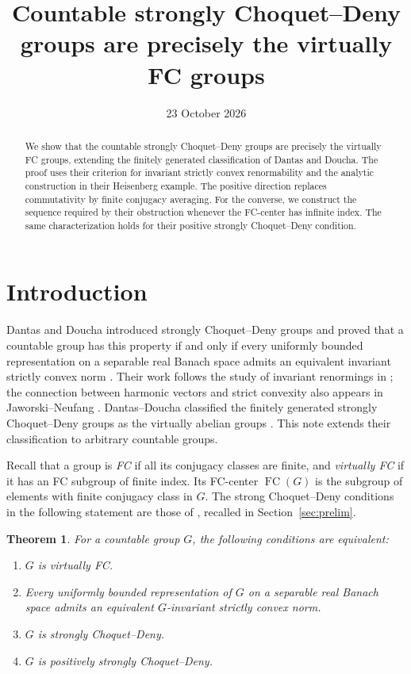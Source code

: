 \documentclass[11pt,letterpaper]{amsart}
\title[The classification of countable strongly Choquet--Deny groups]{Countable strongly Choquet--Deny groups
are precisely the virtually FC groups}
\date{23 October 2026}
\newtheorem{theorem}{Theorem}[section]
\theoremstyle{definition}
\theoremstyle{remark}
\DeclareMathOperator{\FC}{FC}
\begin{document}
\begin{abstract}
We show that the countable strongly Choquet--Deny groups are precisely
the virtually FC groups, extending the finitely generated classification
of Dantas and Doucha. The proof uses their criterion for invariant
strictly convex renormability and the analytic construction in their
Heisenberg example. The positive direction replaces commutativity by
finite conjugacy averaging. For the converse, we construct the sequence
required by their obstruction whenever the FC-center has infinite index.
The same characterization holds for their positive strongly
Choquet--Deny condition.
\end{abstract}
\maketitle

\section{Introduction}
Dantas and Doucha introduced strongly Choquet--Deny groups and proved
that a countable group has this property if and only if every uniformly
bounded representation on a separable real Banach space admits an
equivalent invariant strictly convex norm \cite[Theorem~4.2]{DD}.
Their work follows the study of invariant renormings in \cite{D};
the connection between harmonic vectors and strict convexity also
appears in Jaworski--Neufang \cite[Proposition~2.5]{JN}.
Dantas--Doucha classified the finitely generated strongly Choquet--Deny
groups as the virtually abelian groups \cite[Theorem~5.6]{DD}.
This note extends their classification to arbitrary countable groups.

Recall that a group is \emph{FC} if all its conjugacy classes are finite,
and \emph{virtually FC} if it has an FC subgroup of finite index.
Its FC-center $\FC(G)$ is the subgroup of elements with finite conjugacy
class in $G$. The strong Choquet--Deny conditions in the following
statement are those of \cite[Definition~2.4]{DD}, recalled in
Section~\ref{sec:prelim}.

\begin{theorem}\label{thm:classification}
For a countable group $G$, the following conditions are equivalent:
\begin{enumerate}
\item $G$ is virtually FC.
\item Every uniformly bounded representation of $G$ on a separable real
Banach space admits an equivalent $G$-invariant strictly convex norm.
\item $G$ is strongly Choquet--Deny.
\item $G$ is positively strongly Choquet--Deny.
\end{enumerate}
\end{theorem}
\end{document}
